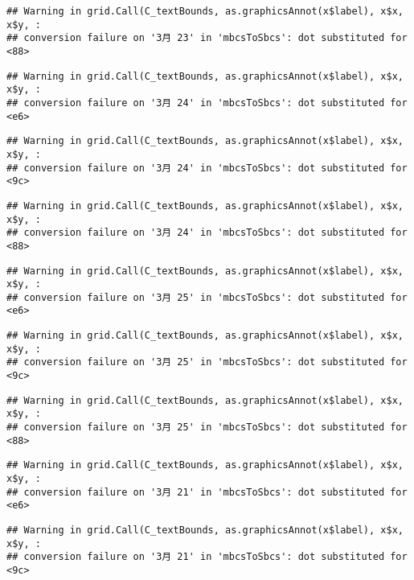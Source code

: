 \documentclass[
]{article}
\begin{document}
\begin{verbatim}
## Warning in grid.Call(C_textBounds, as.graphicsAnnot(x$label), x$x, x$y, :
## conversion failure on '3月 23' in 'mbcsToSbcs': dot substituted for <88>
\end{verbatim}

\begin{verbatim}
## Warning in grid.Call(C_textBounds, as.graphicsAnnot(x$label), x$x, x$y, :
## conversion failure on '3月 24' in 'mbcsToSbcs': dot substituted for <e6>
\end{verbatim}

\begin{verbatim}
## Warning in grid.Call(C_textBounds, as.graphicsAnnot(x$label), x$x, x$y, :
## conversion failure on '3月 24' in 'mbcsToSbcs': dot substituted for <9c>
\end{verbatim}

\begin{verbatim}
## Warning in grid.Call(C_textBounds, as.graphicsAnnot(x$label), x$x, x$y, :
## conversion failure on '3月 24' in 'mbcsToSbcs': dot substituted for <88>
\end{verbatim}

\begin{verbatim}
## Warning in grid.Call(C_textBounds, as.graphicsAnnot(x$label), x$x, x$y, :
## conversion failure on '3月 25' in 'mbcsToSbcs': dot substituted for <e6>
\end{verbatim}

\begin{verbatim}
## Warning in grid.Call(C_textBounds, as.graphicsAnnot(x$label), x$x, x$y, :
## conversion failure on '3月 25' in 'mbcsToSbcs': dot substituted for <9c>
\end{verbatim}

\begin{verbatim}
## Warning in grid.Call(C_textBounds, as.graphicsAnnot(x$label), x$x, x$y, :
## conversion failure on '3月 25' in 'mbcsToSbcs': dot substituted for <88>
\end{verbatim}

\begin{verbatim}
## Warning in grid.Call(C_textBounds, as.graphicsAnnot(x$label), x$x, x$y, :
## conversion failure on '3月 21' in 'mbcsToSbcs': dot substituted for <e6>
\end{verbatim}

\begin{verbatim}
## Warning in grid.Call(C_textBounds, as.graphicsAnnot(x$label), x$x, x$y, :
## conversion failure on '3月 21' in 'mbcsToSbcs': dot substituted for <9c>
\end{verbatim}
\end{document}
